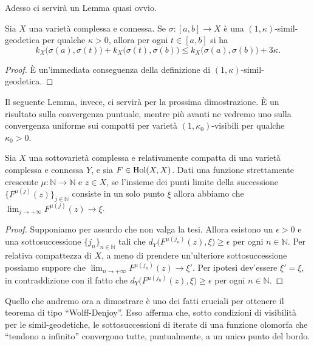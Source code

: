 Adesso ci servirà un Lemma quasi ovvio.

\begin{lm} \label{quasiovvio}
    Sia $X$ una varietà complessa e connessa. Se $\sigma:[a,b] \longrightarrow X$ è una $(1,\kappa)$-simil-geodetica per qualche $\kappa>0$, allora per ogni $t \in [a,b]$ si ha
    $$k_X\big(\sigma(a),\sigma(t)\big)+k_X\big(\sigma(t),\sigma(b)\big) \le k_X\big(\sigma(a),\sigma(b)\big)+3\kappa.$$
\end{lm}

\begin{proof}
    È un'immediata conseguenza della definizione di $(1,\kappa)$-simil-geodetica.
\end{proof}

Il seguente Lemma, invece, ci servirà per la prossima dimostrazione. È un risultato sulla convergenza puntuale, mentre più avanti ne vedremo uno sulla convergenza uniforme sui compatti per varietà $(1,\kappa_0)$-visibili per qualche $\kappa_0>0$.

\begin{lm} \label{lemmasottosotto1}
    Sia $X$ una sottovarietà complessa e relativamente compatta di una varietà complessa e connessa $Y$, e sia $F\in\textnormal{Hol}(X,X)$. Dati una funzione strettamente crescente $\mu:\mathbb{N}\longrightarrow\mathbb{N}$ e $z\in X$, se l'insieme dei punti limite della successione $\{F^{\mu(j)}(z)\}_{j\in\mathbb{N}}$ consiste in un solo punto $\xi$ allora abbiamo che $\displaystyle\lim_{j\longrightarrow+\infty}F^{\mu(j)}(z)\longrightarrow\xi$.
\end{lm}

\begin{proof}
    Supponiamo per assurdo che non valga la tesi. Allora esistono un $\epsilon>0$ e una sottosuccessione $\{j_n\}_{n\in\mathbb{N}}$ tali che $d_Y\big(F^{\mu(j_n)}(z),\xi\big) \ge \epsilon$ per ogni $n\in\mathbb{N}$. Per relativa compattezza di $X$, a meno di prendere un'ulteriore sottosuccessione possiamo suppore che $\displaystyle\lim_{n\longrightarrow+\infty}F^{\mu(j_n)}(z)\longrightarrow\xi'$. Per ipotesi dev'essere $\xi'=\xi$, in contraddizione con il fatto che $d_Y\big(F^{\mu(j_n)}(z),\xi\big) \ge \epsilon$ per ogni $n\in\mathbb{N}$.
\end{proof}

Quello che andremo ora a dimostrare è uno dei fatti cruciali per ottenere il teorema di tipo ``Wolff-Denjoy''. Esso afferma che, sotto condizioni di visibilità per le simil-geodetiche, le sottosuccessioni di iterate di una funzione olomorfa che ``tendono a infinito'' convergono tutte, puntualmente, a un unico punto del bordo.

